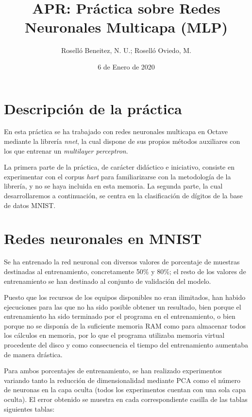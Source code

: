 \documentclass[a4paper]{article}
\begin{document}
\author{Roselló Beneitez, N. U.; Roselló Oviedo, M.}
\title{APR: Práctica sobre Redes Neuronales Multicapa (MLP)}
\date{6 de Enero de 2020}
\maketitle{}
\thispagestyle{empty}

\newpage
\tableofcontents
\listoffigures

\newpage
\section{Descripción de la práctica}
\quad En esta práctica se ha trabajado con redes neuronales multicapa en Octave mediante la librería \textit{nnet}, la cual dispone de sus propios métodos auxiliares con los que entrenar un \textit{multilayer perceptron}.

\quad La primera parte de la práctica, de carácter didáctico e iniciativo, consiste en experimentar con el corpus \textit{hart} para familiarizarse con la metodología de la librería, y no se haya incluida en esta memoria. La segunda parte, la cual desarrollaremos a continuación, se centra en la clasificación de dígitos de la base de datos MNIST.

\section{Redes neuronales en MNIST}
\quad Se ha entrenado la red neuronal con diversos valores de porcentaje de muestras destinadas al entrenamiento, concretamente 50\% y 80\%; el resto de los valores de entrenamiento se han destinado al conjunto de validación del modelo.

\quad Puesto que los recursos de los equipos disponibles no eran ilimitados, han habido ejecuciones para las que no ha sido posible obtener un resultado, bien porque el entrenamiento ha sido terminado por el programa en el entrenamiento, o bien porque no se disponía de la suficiente memoria RAM como para almacenar todos los cálculos en memoria, por lo que el programa utilizaba memoria virtual procedente del disco y como consecuencia el tiempo del entrenamiento aumentaba de manera drástica.

\quad Para ambos porcentajes de entrenamiento, se han realizado experimentos variando tanto la reducción de dimensionalidad mediante PCA como el número de neuronas en la capa oculta (todos los experimentos cuentan con una sola capa oculta). El error obtenido se muestra en cada correspondiente casilla de las tablas siguientes tablas:
\end{document}
